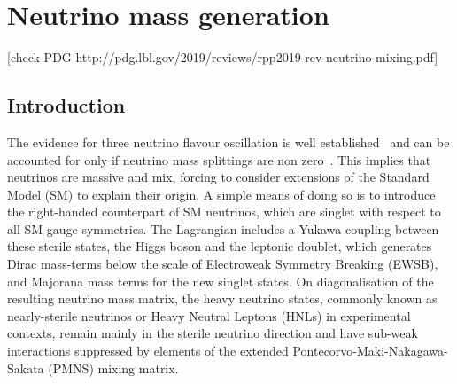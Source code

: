 \clearpage
\chapter{Neutrino mass generation}
\label{cha:neutrino_mass}

[check PDG http://pdg.lbl.gov/2019/reviews/rpp2019-rev-neutrino-mixing.pdf]

\section{Introduction}
\label{sec:introduction}

The evidence for three neutrino flavour oscillation is well established~\cite{Fukuda:1998mi,Aharmim:2005gt} %
and can be accounted for only if neutrino mass splittings are non zero~\cite{nufit}.
This implies that neutrinos are massive and mix, forcing to consider extensions %
of the Standard Model (SM) to explain their origin. 
A simple means of doing so is to introduce the right-handed counterpart of SM neutrinos, which are %
singlet with respect to all SM gauge symmetries.
The Lagrangian includes a Yukawa coupling between these sterile states, the Higgs boson and the leptonic doublet, %
which generates Dirac mass-terms below the scale of Electroweak Symmetry Breaking (EWSB), 
and Majorana mass terms for the new singlet states.
On diagonalisation of the resulting neutrino mass matrix, the heavy neutrino states, %
commonly known as nearly-sterile neutrinos or Heavy Neutral Leptons (HNLs) in experimental contexts, %
remain mainly in the sterile neutrino direction and have sub-weak interactions suppressed by %
elements of the extended Pontecorvo-Maki-Nakagawa-Sakata (PMNS) mixing matrix. 


